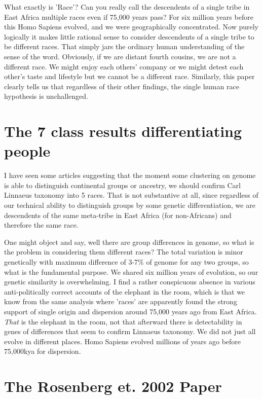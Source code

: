 \documentclass{amsart}
\begin{document}
What exactly is 'Race'?  Can you really call the descendents of a single tribe in East Africa multiple races even if 75,000 years pass?  For six million years before this Homo Sapiens evolved, and we were geographically concentrated.  Now purely logically it makes little rational sense to consider descendents of a single tribe to be different races.  That simply jars the ordinary human understanding of the sense of the word.  Obviously, if we are distant fourth cousins, we are not a different race.  We might enjoy each others' company or we might detest each other's taste and lifestyle but we cannot be a different race.  Similarly, this paper clearly tells us that regardless of their other findings, the single human race hypothesis is unchallenged.

\section{The 7 class results differentiating people}

I have seen some articles suggesting that the moment some clustering on genome is able to distinguish continental groups or ancestry, we should confirm Carl Linnaeus taxonomy into 5 races.  That is not substantive at all, since regardless of our technical ability to distinguish groups by some genetic differentiation, we are descendents of the same meta-tribe in East Africa (for non-Africans) and therefore the same race.

One might object and say, well there are group differences in genome, so what is the problem in considering them different races?  The total variation is minor genetically with maximum difference of 3-7\% of genome for any two groups, so what is the fundamental purpose.  We shared six million years of evolution, so our genetic similarity is overwhelming.  I find a rather conspicuous absence in various anti-politically correct accounts of the elephant in the room, which is that we know from the same analysis where 'races' are apparently found the strong support of single origin and dispersion around 75,000 years ago from East Africa.  {\em That} is the elephant in the room, not that afterward there is detectability in genes of differences that seem to confirm Linnaeus taxonomy.  We did not just all evolve in different places.  Homo Sapiens evolved millions of years ago before 75,000kya for dispersion. 

\section{The Rosenberg et. 2002 Paper}
\end{document}
